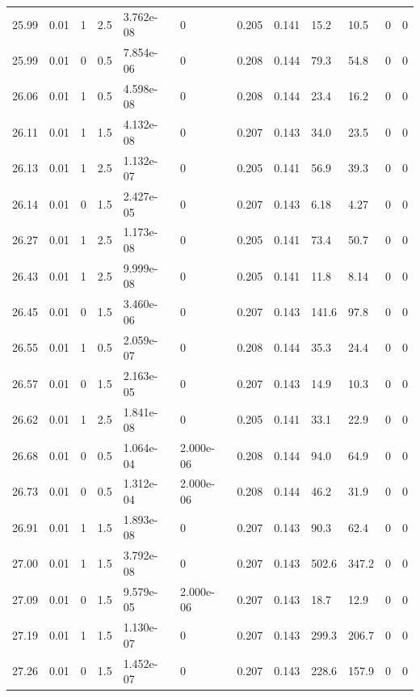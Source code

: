 \documentclass[preview]{standalone}
\begin{document}
{{{{{{{{\begin{tabular}{L{1.2cm}C{1.2cm} C{0.3cm}C{0.5cm} C{1.4cm}C{1.4cm} C{1.4cm}C{1.4cm} C{1.6cm}C{1.6cm} C{1.6cm}C{1.6cm}}
  25.99  &  0.01  & 1     & 2.5 &  3.762e-08  & 0  &  0.205&   0.141& 15.2 & 10.5   &  0 & 0  \\ 
  25.99  &  0.01  & 0     & 0.5 &  7.854e-06  & 0  &  0.208&   0.144& 79.3 & 54.8   &  0 & 0  \\ 
  26.06  &  0.01  & 1     & 0.5 &  4.598e-08  & 0  &  0.208&   0.144& 23.4 & 16.2   &  0 & 0  \\ 
  26.11  &  0.01  & 1     & 1.5 &  4.132e-08  & 0  &  0.207&   0.143& 34.0 & 23.5   &  0 & 0  \\ 
  26.13  &  0.01  & 1     & 2.5 &  1.132e-07  & 0  &  0.205&   0.141& 56.9 & 39.3   &  0 & 0  \\ 
  26.14  &  0.01  & 0     & 1.5 &  2.427e-05  & 0  &  0.207&   0.143& 6.18 & 4.27   &  0 & 0  \\ 
  26.27  &  0.01  & 1     & 2.5 &  1.173e-08  & 0  &  0.205&   0.141& 73.4 & 50.7   &  0 & 0  \\ 
  26.43  &  0.01  & 1     & 2.5 &  9.999e-08  & 0  &  0.205&   0.141& 11.8 & 8.14   &  0 & 0  \\ 
  26.45  &  0.01  & 0     & 1.5 &  3.460e-06  & 0  &  0.207&   0.143& 141.6 & 97.8   &  0 & 0  \\ 
  26.55  &  0.01  & 1     & 0.5 &  2.059e-07  & 0  &  0.208&   0.144& 35.3 & 24.4   &  0 & 0  \\ 
  26.57  &  0.01  & 0     & 1.5 &  2.163e-05  & 0  &  0.207&   0.143& 14.9 & 10.3   &  0 & 0  \\ 
  26.62  &  0.01  & 1     & 2.5 &  1.841e-08  & 0  &  0.205&   0.141& 33.1 & 22.9   &  0 & 0  \\ 
  26.68  &  0.01  & 0     & 0.5 &  1.064e-04  & 2.000e-06  &  0.208&   0.144& 94.0 & 64.9   &  0 & 0  \\ 
  26.73  &  0.01  & 0     & 0.5 &  1.312e-04  & 2.000e-06  &  0.208&   0.144& 46.2 & 31.9   &  0 & 0  \\ 
  26.91  &  0.01  & 1     & 1.5 &  1.893e-08  & 0  &  0.207&   0.143& 90.3 & 62.4   &  0 & 0  \\ 
  27.00  &  0.01  & 1     & 1.5 &  3.792e-08  & 0  &  0.207&   0.143& 502.6 & 347.2   &  0 & 0  \\ 
  27.09  &  0.01  & 0     & 1.5 &  9.579e-05  & 2.000e-06  &  0.207&   0.143& 18.7 & 12.9   &  0 & 0  \\ 
  27.19  &  0.01  & 1     & 1.5 &  1.130e-07  & 0  &  0.207&   0.143& 299.3 & 206.7   &  0 & 0  \\ 
  27.26  &  0.01  & 0     & 1.5 &  1.452e-07  & 0  &  0.207&   0.143& 228.6 & 157.9   &  0 & 0  \\ 

\end{tabular}}}}}}}}}
\end{document}
